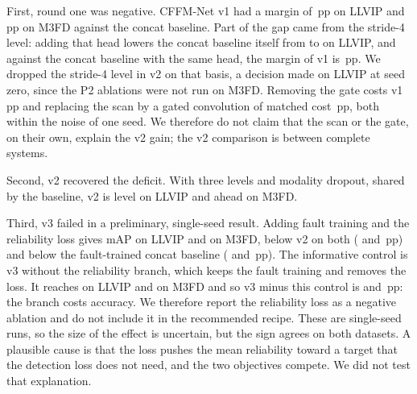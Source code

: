 First, round one was negative. CFFM-Net v1 had a margin of \marLlvipVoneVsConcatPlainSeedZeroMap{}\,pp on LLVIP and \marMfdVoneVsConcatPlainSeedZeroMap{}\,pp on M3FD against the concat baseline. Part of the gap came from the stride-4 level: adding that head lowers the concat baseline itself from \resLlvipConcatPlainSeedZeroMap{} to \resLlvipConcatPtwoSeedZeroMap{} on LLVIP, and against the concat baseline with the same head, the margin of v1 is \marLlvipVoneVsConcatPtwoSeedZeroMap{}\,pp. We dropped the stride-4 level in v2 on that basis, a decision made on LLVIP at seed zero, since the P2 ablations were not run on M3FD. Removing the gate costs v1 \marLlvipVoneVsVoneNogateSeedZeroMap{}\,pp and replacing the scan by a gated convolution of matched cost \marLlvipVoneVsVoneGconvSeedZeroMap{}\,pp, both within the noise of one seed. We therefore do not claim that the scan or the gate, on their own, explain the v2 gain; the v2 comparison is between complete systems.

Second, v2 recovered the deficit. With three levels and modality dropout, shared by the baseline, v2 is level on LLVIP and ahead on M3FD.

Third, v3 failed in a preliminary, single-seed result. Adding fault training and the reliability loss gives \resLlvipCffmVthreeSeedZeroMap{} mAP on LLVIP and \resMfdCffmVthreeSeedZeroMap{} on M3FD, below v2 on both (\marLlvipVthreeVsVtwoSeedZeroMap{} and \marMfdVthreeVsVtwoSeedZeroMap{}\,pp) and below the fault-trained concat baseline (\marLlvipVthreeVsConcatFtSeedZeroMap{} and \marMfdVthreeVsConcatFtSeedZeroMap{}\,pp). The informative control is v3 without the reliability branch, which keeps the fault training and removes the loss. It reaches \resLlvipCffmVthreeNorelSeedZeroMap{} on LLVIP and \resMfdCffmVthreeNorelSeedZeroMap{} on M3FD and so v3 minus this control is \marLlvipVthreeVsVthreeNorelSeedZeroMap{} and \marMfdVthreeVsVthreeNorelSeedZeroMap{}\,pp: the branch costs accuracy. We therefore report the reliability loss as a negative ablation and do not include it in the recommended recipe. These are single-seed runs, so the size of the effect is uncertain, but the sign agrees on both datasets. A plausible cause is that the loss pushes the mean reliability toward a target that the detection loss does not need, and the two objectives compete. We did not test that explanation.

